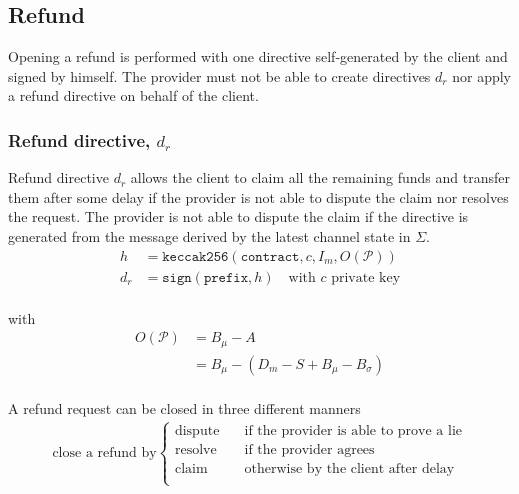 \documentclass{llncs}
\begin{document}
\subsection{Refund} Opening a refund is performed with one directive self-generated by the client and signed by himself. The provider must not be able to create directives $d_r$ nor apply a refund directive on behalf of the client.

\subsubsection{Refund directive, $d_r$} Refund directive $d_r$ allows the client to claim all the remaining funds and transfer them after some delay if the provider is not able to dispute the claim nor resolves the request. The provider is not able to dispute the claim if the directive is generated from the message derived by the latest channel state in $\Sigma$.
\begin{equation*}
\begin{split}
    h &= \texttt{keccak256}(\texttt{contract},c,I_m,O(\mathcal{P})) \\
    d_r &= \texttt{sign}(\texttt{prefix}, h) \quad \text{with $c$ private key} \\
\end{split}
\end{equation*}

with
\begin{equation*}
\begin{split}
    O(\mathcal{P}) &= B_\mu - A \\
    &= B_\mu - (D_m - S + B_\mu - B_\sigma) \\
\end{split}
\end{equation*}

A refund request can be closed in three different manners
\begin{equation*}
\begin{split}
    \text{close a refund by}
  \begin{cases}
      \text{dispute} & \quad \text{if the provider is able to prove a lie} \\
      \text{resolve} & \quad \text{if the provider agrees} \\
      \text{claim} & \quad \text{otherwise by the client after delay} \\
  \end{cases}
\end{split}
\end{equation*}
\end{document}

